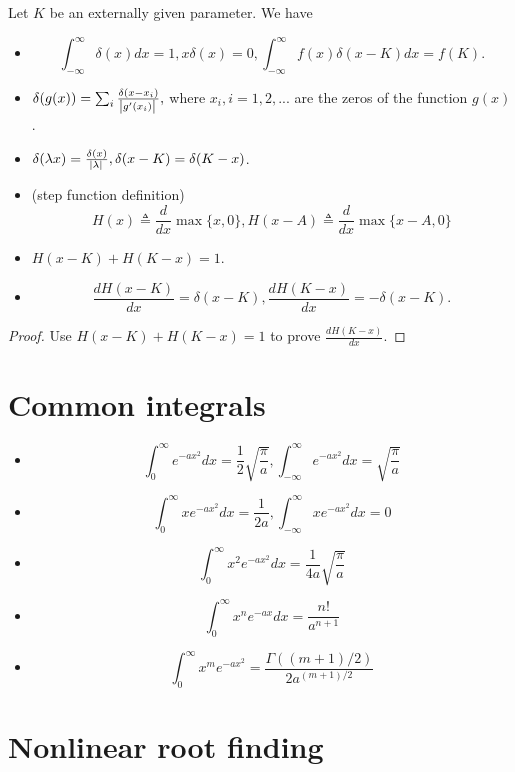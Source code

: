 \begin{refsection}
\begin{lemma}\label{appendix:th:propertiesDeltaFunctionStepFunction}\cite[579]{prosperetti2013advanced} Let $K$ be an externally given parameter. We have
\begin{itemize}
	\item $$\int_{-\infty}^{\infty} \delta(x)dx = 1, x\delta(x) = 0, \int_{-\infty}^{\infty} f(x)\delta(x-K)dx = f(K).$$
	\item $\delta(g(x)) = \sum_{i} \frac{\delta(x-x_i)}{\abs{g'(x_i)}},$
	where $x_i,i=1,2,...$ are the zeros of the function $g(x)$.
	\item $\delta(\lambda x) = \frac{\delta(x)}{\abs{\lambda}}, \delta(x-K) = \delta(K-x)$.
	\item (step function definition) $$H(x)\triangleq \frac{d}{dx}\max\{x,0\}, H(x- A)\triangleq \frac{d}{dx}\max\{x-A,0\}$$
	\item $H(x-K) +　　H(K-x) = 1$.
	\item $$\frac{dH(x-K)}{dx} = \delta(x-K), \frac{dH(K-x)}{dx} = -\delta(x-K).$$	
\end{itemize}
\end{lemma}
\begin{proof}
Use $H(x-K) +　　H(K-x) = 1$ to prove $\frac{dH(K-x)}{dx}$.
\end{proof}

\section{Common integrals}

\begin{lemma}\hfill
\begin{itemize}
	\item $$\int_0^\infty e^{-ax^2}dx = \frac{1}{2}\sqrt{\frac{\pi}{a}},\int_{-\infty}^\infty e^{-ax^2}dx = \sqrt{\frac{\pi}{a}}$$
	\item  $$\int_0^\infty xe^{-ax^2}dx = \frac{1}{2a},\int_{-\infty}^\infty xe^{-ax^2}dx = 0$$
	\item  $$\int_0^\infty x^2e^{-ax^2}dx = \frac{1}{4a}\sqrt{\frac{\pi}{a}}$$
	\item $$\int_0^\infty x^n e^{-ax}dx = \frac{n!}{a^{n+1}}$$
	\item $$\int_0^\infty x^m e^{-ax^2} = \frac{\Gamma((m+1)/2)}{2a^{(m+1)/2}}$$	
\end{itemize}	
	
\end{lemma}


\section{Nonlinear root finding}

\end{refsection}
